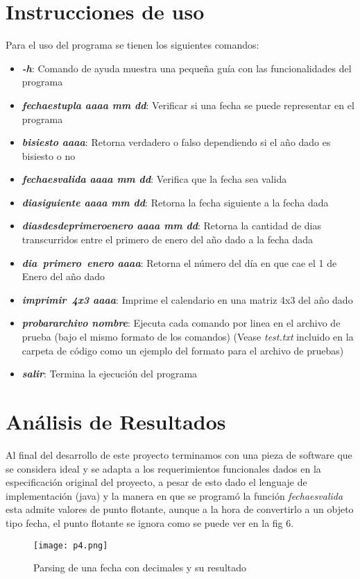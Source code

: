 \documentclass[10pt,journal,compsoc]{IEEEtran}
\begin{document}
\section{Instrucciones de uso}
\par Para el uso del programa se tienen los siguientes comandos:
\begin{itemize}
	\item \textbf{\textit{-h}}: Comando de ayuda muestra una pequeña guía con las funcionalidades del programa
	\item \textbf{\textit{fecha\textunderscore es\textunderscore tupla aaaa mm dd}}: Verificar si una fecha se puede representar en el programa
	\item \textbf{\textit{bisiesto aaaa}}: Retorna verdadero o falso dependiendo si el año dado es bisiesto o no
	\item \textbf{\textit{fecha\textunderscore es\textunderscore valida aaaa mm dd}}: Verifica que la fecha sea valida
	\item \textbf{\textit{dia\textunderscore siguiente aaaa mm dd}}: Retorna la fecha siguiente a la fecha dada
	\item \textbf{\textit{dias\textunderscore desde\textunderscore primero\textunderscore enero aaaa mm dd}}: Retorna la cantidad de dias transcurridos entre el primero de enero del año dado a la fecha dada
	\item \textbf{\textit{dia\textunderscore~primero\textunderscore~enero aaaa}}: Retorna el número del día en que cae el 1 de Enero del año dado
	\item \textbf{\textit{imprimir\textunderscore~4x3 aaaa}}: Imprime el calendario en una matriz 4x3 del año dado
	\item \textbf{\textit{probar\textunderscore archivo nombre}}: Ejecuta cada comando por linea en el archivo de prueba (bajo el mismo formato de los comandos) (Vease \textit{test.txt} incluido en la carpeta de código como un ejemplo del formato para el archivo de pruebas)
	\item \textbf{\textit{salir}}: Termina la ejecución del programa
\end{itemize}
\section{Análisis de Resultados}
\par Al final del desarrollo de este proyecto terminamos con una pieza de software que se considera ideal y se adapta a los requerimientos funcionales dados en la especificación original del proyecto, a pesar de esto dado el lenguaje de implementación (java) y la manera en que se programó la función \textit{fecha\textunderscore es\textunderscore valida} esta admite valores de punto flotante, aunque a la hora de convertirlo a un objeto tipo fecha, el punto flotante se ignora como se puede ver en la fig 6.
\begin{figure}[h!]
	\centering
	\texttt{[image: p4.png]}
	\caption{Parsing de una fecha con decimales y su resultado}
\end{figure}
	
	
	
	
	
	
	
	
	
	
	
	
	
	
	
	
	
	
	
	
	
\end{document}
